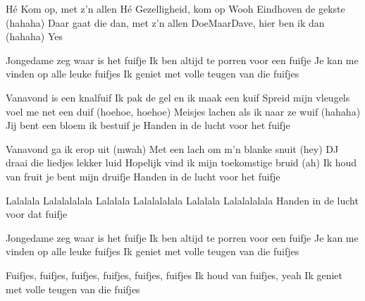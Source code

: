
\begin{verse*}
Hé
Kom op, met z'n allen
Hé
Gezelligheid, kom op
Wooh
Eindhoven de gekste (hahaha)
Daar gaat die dan, met z'n allen
DoeMaarDave, hier ben ik dan (hahaha)
Yes
\end{verse*}

\begin{chorus}
Jongedame zeg waar is het fuifje
Ik ben altijd te porren voor een fuifje
Je kan me vinden op alle leuke fuifjes
Ik geniet met volle teugen van die fuifjes
\end{chorus}

\begin{verse*}
Vanavond is een knalfuif
Ik pak de gel en ik maak een kuif
Spreid mijn vleugels voel me net een duif (hoehoe, hoehoe)
Meisjes lachen als ik naar ze wuif (hahaha)
Jij bent een bloem ik bestuif je
Handen in de lucht voor het fuifje
\end{verse*}

\thechorus

\begin{verse*}
Vanavond ga ik erop uit (mwah)
Met een lach om m'n blanke snuit (hey)
DJ draai die liedjes lekker luid
Hopelijk vind ik mijn toekomstige bruid (ah)
Ik houd van fruit je bent mijn druifje
Handen in de lucht voor het fuifje
\end{verse*}

\thechorus

\begin{verse*}
Lalalala Lalalalalala
Lalalala Lalalalalala
Lalalala Lalalalalala
Handen in de lucht voor dat fuifje
\end{verse*}

\begin{verse*}
Jongedame zeg waar is het fuifje
Ik ben altijd te porren voor een fuifje
Je kan me vinden op alle leuke fuifjes
Ik geniet met volle teugen van die fuifjes
\end{verse*}

\begin{verse*}
Fuifjes, fuifjes, fuifjes, fuifjes, fuifjes, fuifjes
Ik houd van fuifjes, yeah
Ik geniet met volle teugen van die fuifjes
\end{verse*}